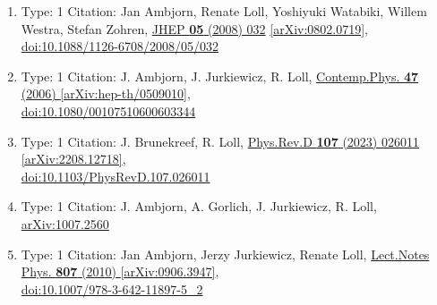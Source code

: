\documentclass[a4paper,10pt]{article}
\begin{document}
\begin{enumerate}
\begin{enumerate}
  \item Type: 1 Citation: Jan Ambjorn, Renate Loll, Yoshiyuki Watabiki, Willem Westra, Stefan Zohren, \href{https://www.doi.org/10.1088/1126-6708/2008/05/032}{JHEP {\bf 05} (2008) 032}  \href{https://arxiv.org/abs/0802.0719}{[arXiv:0802.0719]},\\\href{https://www.doi.org/10.1088/1126-6708/2008/05/032}{doi:10.1088/1126-6708/2008/05/032}
  \item Type: 1 Citation: J. Ambjorn, J. Jurkiewicz, R. Loll, \href{https://www.doi.org/10.1080/00107510600603344}{Contemp.Phys. {\bf 47} (2006) }  \href{https://arxiv.org/abs/hep-th/0509010}{[arXiv:hep-th/0509010]},\\\href{https://www.doi.org/10.1080/00107510600603344}{doi:10.1080/00107510600603344}
  \item Type: 1 Citation: J. Brunekreef, R. Loll, \href{https://www.doi.org/10.1103/PhysRevD.107.026011}{Phys.Rev.D {\bf 107} (2023) 026011}  \href{https://arxiv.org/abs/2208.12718}{[arXiv:2208.12718]},\\\href{https://www.doi.org/10.1103/PhysRevD.107.026011}{doi:10.1103/PhysRevD.107.026011}
  \item Type: 1 Citation: J. Ambjorn, A. Gorlich, J. Jurkiewicz, R. Loll, \href{https://arxiv.org/abs/1007.2560}{arXiv:1007.2560}
  \item Type: 1 Citation: Jan Ambjorn, Jerzy Jurkiewicz, Renate Loll, \href{https://www.doi.org/10.1007/978-3-642-11897-5_2}{Lect.Notes Phys. {\bf 807} (2010) }  \href{https://arxiv.org/abs/0906.3947}{[arXiv:0906.3947]},\\\href{https://www.doi.org/10.1007/978-3-642-11897-5_2}{doi:10.1007/978-3-642-11897-5\_2}

\end{enumerate}
\end{enumerate}
\end{document}
